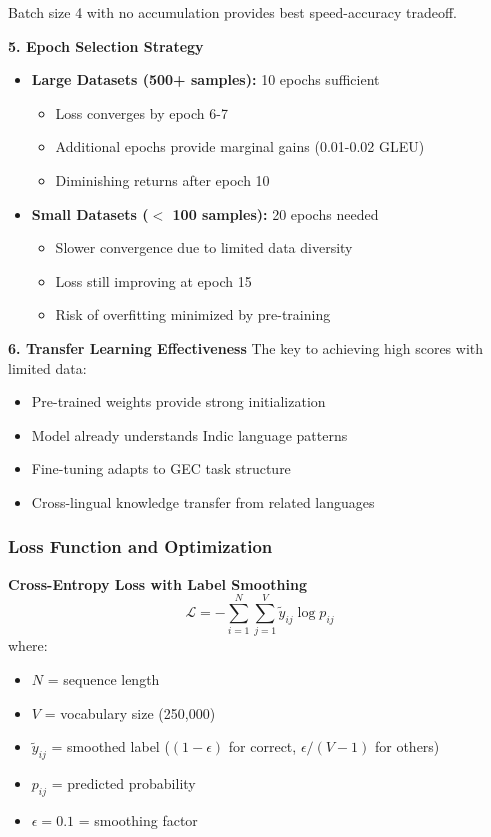 \documentclass[12pt,a4paper]{article}
\begin{document}
Batch size 4 with no accumulation provides best speed-accuracy tradeoff.

\textbf{5. Epoch Selection Strategy}
\begin{itemize}
    \item \textbf{Large Datasets (500+ samples):} 10 epochs sufficient
    \begin{itemize}
        \item Loss converges by epoch 6-7
        \item Additional epochs provide marginal gains (0.01-0.02 GLEU)
        \item Diminishing returns after epoch 10
    \end{itemize}
    \item \textbf{Small Datasets ($<$ 100 samples):} 20 epochs needed
    \begin{itemize}
        \item Slower convergence due to limited data diversity
        \item Loss still improving at epoch 15
        \item Risk of overfitting minimized by pre-training
    \end{itemize}
\end{itemize}

\textbf{6. Transfer Learning Effectiveness}
The key to achieving high scores with limited data:
\begin{itemize}
    \item Pre-trained weights provide strong initialization
    \item Model already understands Indic language patterns
    \item Fine-tuning adapts to GEC task structure
    \item Cross-lingual knowledge transfer from related languages
\end{itemize}

\subsubsection{Loss Function and Optimization}

\textbf{Cross-Entropy Loss with Label Smoothing}
\begin{equation}
    \mathcal{L} = -\sum_{i=1}^{N} \sum_{j=1}^{V} \tilde{y}_{ij} \log p_{ij}
\end{equation}
where:
\begin{itemize}
    \item $N$ = sequence length
    \item $V$ = vocabulary size (250,000)
    \item $\tilde{y}_{ij}$ = smoothed label ($(1-\epsilon)$ for correct, $\epsilon/(V-1)$ for others)
    \item $p_{ij}$ = predicted probability
    \item $\epsilon = 0.1$ = smoothing factor
\end{itemize}
\end{document}
